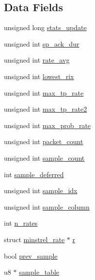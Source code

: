\subsection*{Data Fields}
\begin{DoxyCompactItemize}
\item 
unsigned long \hyperlink{structminstrel__sta__info_a3c5301bb7fd4073bbad86d50eff8f188}{stats\-\_\-update}
\item 
unsigned int \hyperlink{structminstrel__sta__info_a1023b3884bcb7252fd484344ce4d5201}{sp\-\_\-ack\-\_\-dur}
\item 
unsigned int \hyperlink{structminstrel__sta__info_a28afea3f4f42a76c7ea48b9ac0399b76}{rate\-\_\-avg}
\item 
unsigned int \hyperlink{structminstrel__sta__info_a8f2a0e4bbfab7a7d1848bed87ae6ff84}{lowest\-\_\-rix}
\item 
unsigned int \hyperlink{structminstrel__sta__info_ae61b14461f5cfea710f666fe40906493}{max\-\_\-tp\-\_\-rate}
\item 
unsigned int \hyperlink{structminstrel__sta__info_aaa4f3e0147c91173f7dd6d86b82ba0ee}{max\-\_\-tp\-\_\-rate2}
\item 
unsigned int \hyperlink{structminstrel__sta__info_a4a4625871f05851116acae11b392a957}{max\-\_\-prob\-\_\-rate}
\item 
unsigned int \hyperlink{structminstrel__sta__info_af0a068e62b23d45baeffebf5250afd21}{packet\-\_\-count}
\item 
unsigned int \hyperlink{structminstrel__sta__info_a9c671b28b78e58cee0581915eadec995}{sample\-\_\-count}
\item 
int \hyperlink{structminstrel__sta__info_a73679483ce1d15dfa5cbd2705109f48f}{sample\-\_\-deferred}
\item 
unsigned int \hyperlink{structminstrel__sta__info_a6a478735f9902c260260559529323f93}{sample\-\_\-idx}
\item 
unsigned int \hyperlink{structminstrel__sta__info_a9096126b3357b30a3a2c97059127c15b}{sample\-\_\-column}
\item 
int \hyperlink{structminstrel__sta__info_abea138d7b28f0fb6b6877d27555ed046}{n\-\_\-rates}
\item 
struct \hyperlink{structminstrel__rate}{minstrel\-\_\-rate} $\ast$ \hyperlink{structminstrel__sta__info_aff05543e291b9d013012d0a94c3d4428}{r}
\item 
bool \hyperlink{structminstrel__sta__info_a5cd8f1c60ce3302d16a34887cb5cc2ea}{prev\-\_\-sample}
\item 
u8 $\ast$ \hyperlink{structminstrel__sta__info_aec1be199b41d56f11787b0eb67f6163c}{sample\-\_\-table}
\end{DoxyCompactItemize}


